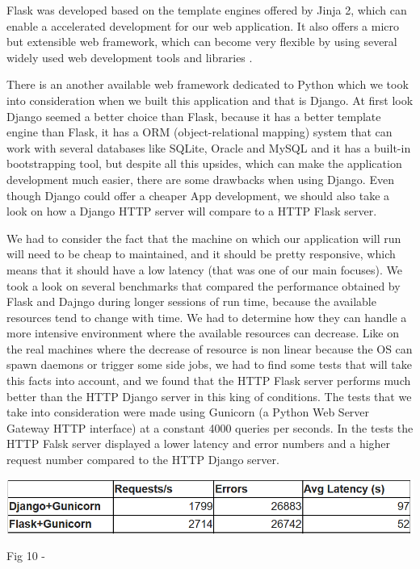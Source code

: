 \documentclass[12pt, a4paper]{report}
\begin{document}
Flask was developed based on the template engines offered by Jinja 2, which can enable a accelerated development for our web application. It also offers a micro but extensible web framework, which can become very flexible by using several widely used web development tools and libraries \cite{Flask1}.
\par 

There is an another available web framework dedicated to Python which we took into consideration when we built this application and that is Django. At first look Django seemed a better choice than Flask, because it has a better template engine than Flask, it has a ORM (object-relational mapping) system that can work with several databases like SQLite, Oracle and MySQL and it has a built-in bootstrapping tool, but despite all this upsides, which can make the application development much easier, there are some drawbacks when using Django. Even though Django could offer a cheaper App development, we should also take a look on how a Django HTTP server will compare to a HTTP Flask server.
\par 

We had to consider the fact that the machine on which our application will run will need to be cheap to maintained, and it should be pretty responsive, which means that it should have a low latency (that was one of our main focuses). We took a look on several benchmarks that compared the performance obtained by Flask and Dajngo during longer sessions of run time, because the available resources tend to change with time. We had to determine how they can handle a more intensive environment where the available resources can decrease. Like on the real machines where the decrease of resource is non linear because the OS can spawn daemons or trigger some side jobs, we had to find some tests that will take this facts into account, and we found that the HTTP Flask server performs much better than the HTTP Django server in this king of conditions. The tests that we take into consideration \cite{Flask2} were made using Gunicorn (a Python Web Server Gateway HTTP interface) at a constant 4000 queries per seconds. In the tests the HTTP Falsk server displayed a lower latency and  error numbers and a higher request number compared to the HTTP Django server.
\par 

\bigskip
\includegraphics[scale=0.7, center]{django-flask-table.png}
\begin{center}
Fig 10 - \cite{Flask2}
\end{center}
\end{document}
